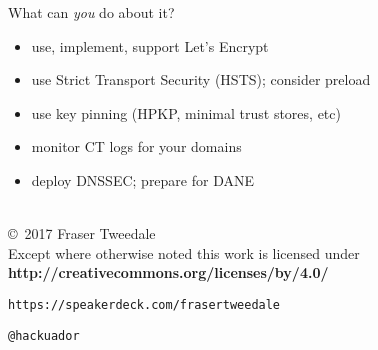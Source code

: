 \documentclass[ignorenonframetext,aspectratio=169]{beamer}
\begin{document}
\begin{frame}{What can \emph{you} do about it?}

\begin{itemize}
\item
  use, implement, support Let's Encrypt
\item
  use Strict Transport Security (HSTS); consider preload
\item
  use key pinning (HPKP, minimal trust stores, etc)
\item
  monitor CT logs for your domains
\item
  deploy DNSSEC; prepare for DANE
\end{itemize}

\end{frame}

\begin{frame}[plain]




    \setlength{\parskip}{.5em}

    { \centering

    
    \\
    \copyright~2017  Fraser Tweedale
    \\
    { \scriptsize
    Except where otherwise noted this work is licensed under
    }\\
    { \footnotesize
    \textbf{http://creativecommons.org/licenses/by/4.0/}
    }

    \bigskip
    \Large

    \texttt{https://speakerdeck.com/frasertweedale}

    \texttt{@hackuador}

    }


\end{frame}
\end{document}
